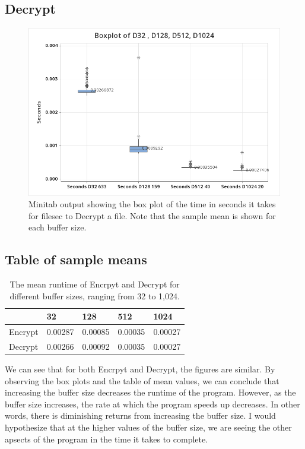 \documentclass{article}
\begin{document}
\clearpage
\subsection*{Decrypt}
\begin{figure}[h]
  \centering
  \includegraphics[width=1\textwidth]{./d.png}
  \caption{Minitab output showing the box plot of the time
  in seconds it takes for filesec to Decrypt a file.
  Note that the sample mean is shown for each buffer size.}
  \label{fig:D}
\end{figure}

\subsection*{Table of sample means}
\begin{table}[htbp]
  \begin{tabularx}{\textwidth}{|X|X|X|X|X|}
  \hline
          & 32 & 128 & 512 & 1024 \\
  \hline
  Encrypt & 0.00287 & 0.00085 & 0.00035 & 0.00027 \\
  \hline
  Decrypt & 0.00266 & 0.00092 & 0.00035 & 0.00027 \\
  \hline
  \end{tabularx}
  \caption{The mean runtime of Encrpyt and Decrypt for different buffer sizes, ranging from 32 to 1,024.}
  \end{table}

  We can see that for both Encrpyt and Decrypt, the figures are similar.
  By observing the box plots and the table of mean values, we can conclude that increasing
  the buffer size decreases the runtime of the program.
  However, as the buffer size increases, the rate at which the program speeds up decreases.
  In other words, there is diminishing returns from increasing the buffer size.
  I would hypothesize that at the higher values of the buffer size,
  we are seeing the other apsects of the program in the time it takes to complete.
\end{document}

